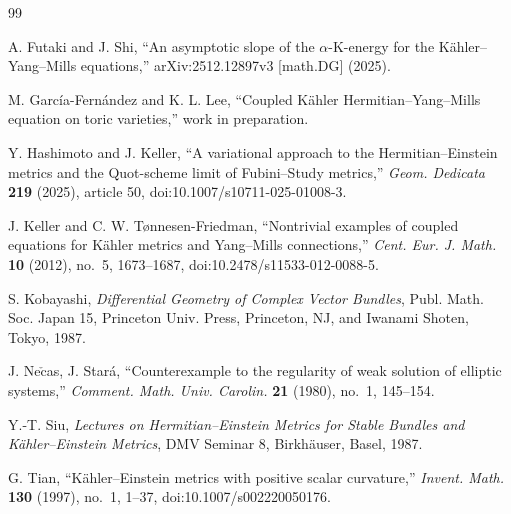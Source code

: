\documentclass[10pt, letterpaper]{amsart}
\theoremstyle{plain}
\theoremstyle{definition}
\numberwithin{equation}{section}
\begin{document}
\begin{thebibliography}{99}

 A. Futaki and J. Shi,
``An asymptotic slope of the $\alpha$-K-energy for the
K\"ahler--Yang--Mills equations,'' arXiv:2512.12897v3 [math.DG] (2025).


 M. Garc\'ia-Fern\'andez and K. L. Lee,
``Coupled K\"ahler Hermitian--Yang--Mills equation on toric varieties,''
work in preparation.


 Y. Hashimoto and J. Keller,
``A variational approach to the Hermitian--Einstein metrics and the
Quot-scheme limit of Fubini--Study metrics,''
\emph{Geom. Dedicata} \textbf{219} (2025), article 50,
doi:10.1007/s10711-025-01008-3.

 J. Keller and C. W. T{\o}nnesen-Friedman,
``Nontrivial examples of coupled equations for K\"ahler metrics and
Yang--Mills connections,'' \emph{Cent. Eur. J. Math.} \textbf{10} (2012),
no.~5, 1673--1687, doi:10.2478/s11533-012-0088-5.

 S. Kobayashi, \emph{Differential Geometry of Complex Vector
Bundles}, Publ. Math. Soc. Japan 15, Princeton Univ. Press, Princeton, NJ,
and Iwanami Shoten, Tokyo, 1987.


J. Ne$\check{\text{c}}$as, J. Star\'a, ``Counterexample to the regularity of weak solution of elliptic systems,''
\emph{Comment. Math. Univ. Carolin.} \textbf{21} (1980), no.~1, 145--154.

 Y.-T. Siu, \emph{Lectures on Hermitian--Einstein Metrics for
Stable Bundles and K\"ahler--Einstein Metrics}, DMV Seminar 8,
Birkh\"auser, Basel, 1987.


 G. Tian, ``K\"ahler--Einstein metrics with positive scalar
curvature,'' \emph{Invent. Math.} \textbf{130} (1997), no.~1, 1--37,
doi:10.1007/s002220050176.


\end{thebibliography}
\end{document}
